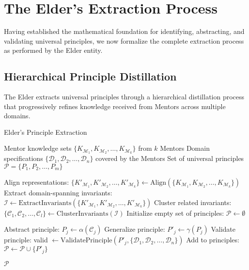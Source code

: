 \section{The Elder's Extraction Process}

Having established the mathematical foundation for identifying, abstracting, and validating universal principles, we now formalize the complete extraction process as performed by the Elder entity.

\subsection{Hierarchical Principle Distillation}

The Elder extracts universal principles through a hierarchical distillation process that progressively refines knowledge received from Mentors across multiple domains.

\begin{algorithm}
\caption{Elder's Principle Extraction}
\begin{algorithmic}[1]
\Require Mentor knowledge sets $\{K_{\mathcal{M}_1}, K_{\mathcal{M}_2}, \ldots, K_{\mathcal{M}_k}\}$ from $k$ Mentors
\Require Domain specifications $\{\mathcal{D}_1, \mathcal{D}_2, \ldots, \mathcal{D}_n\}$ covered by the Mentors
\Ensure Set of universal principles $\mathcal{P} = \{P_1, P_2, \ldots, P_m\}$

\State Align representations: $\{K'_{\mathcal{M}_1}, K'_{\mathcal{M}_2}, \ldots, K'_{\mathcal{M}_k}\} \gets \text{Align}(\{K_{\mathcal{M}_1}, K_{\mathcal{M}_2}, \ldots, K_{\mathcal{M}_k}\})$
\State Extract domain-spanning invariants: $\mathcal{I} \gets \text{ExtractInvariants}(\{K'_{\mathcal{M}_1}, K'_{\mathcal{M}_2}, \ldots, K'_{\mathcal{M}_k}\})$
\State Cluster related invariants: $\{\mathcal{C}_1, \mathcal{C}_2, \ldots, \mathcal{C}_l\} \gets \text{ClusterInvariants}(\mathcal{I})$
\State Initialize empty set of principles: $\mathcal{P} \gets \emptyset$

    \State Abstract principle: $P_j \gets \alpha(\mathcal{C}_j)$
    \State Generalize principle: $P'_j \gets \gamma(P_j)$
    \State Validate principle: valid $\gets \text{ValidatePrinciple}(P'_j, \{\mathcal{D}_1, \mathcal{D}_2, \ldots, \mathcal{D}_n\})$
        \State Add to principles: $\mathcal{P} \gets \mathcal{P} \cup \{P'_j\}$
    \EndIf
\EndFor

\State \Return $\mathcal{P}$
\end{algorithmic}
\end{algorithm}

